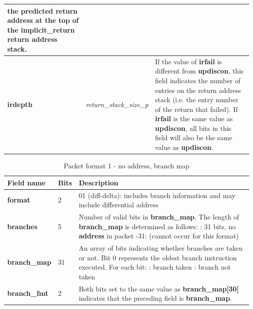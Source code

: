 \begin{table}[htp]
\begin{tabulary}{\textwidth}{|l|p{35mm}|p{90mm}|}
                the predicted return address at the top of the implicit\_return return address stack.\\
    \hline
    \textbf{irdepth}	& \textit {return\_stack\_size\_p} & 
                If the value of \textbf{irfail} is different from \textbf{updiscon}, this field indicates 
                the number of entries on the return address stack (i.e. the entry number of the return that
                failed).  If \textbf{irfail} is the same value as \textbf{updiscon}, all bits in this field 
                will also be the same value as \textbf{updiscon}. \\
    \hline
  \end{tabulary}
\end{table}

\begin{table}[htp]
  \centering
  \caption{Packet format 1  - no address, branch map}
  \label{tab:te_inst1-noaddr-map}
  \begin{tabulary}{\textwidth}{|l|p{35mm}|p{90mm}|}
    \hline
    {\bf Field name} & {\bf Bits} & {\bf Description} \\
    \hline
    \textbf{format}	& 2	& 01 (diff-delta): includes branch information and may include differential address\\
    \hline
    \textbf{branches} & 5 & Number of valid bits in \textbf{branch\_map}. The length of \textbf{branch\_map} is determined as follows: :    31 bits, no \textbf{address} in packet -31: (cannot occur for this format) \\
    \hline
    \textbf{branch\_map} & 31 & 
                 An array of bits indicating whether branches are taken or not.\newline
    Bit 0 represents the oldest branch instruction executed.   For each bit: : branch taken : branch not taken \\
    \hline
    \textbf{branch\_fmt} & 2  & Both bits set to the same value as \textbf{branch\_map[30]} indicates that the
    preceding field is \textbf{branch\_map}. \\
    \hline
  \end{tabulary}
\end{table}

